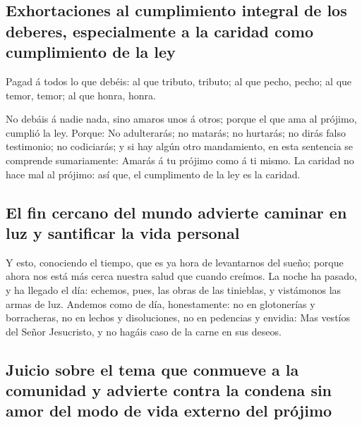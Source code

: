 \hypertarget{exhortaciones-al-cumplimiento-integral-de-los-deberes-especialmente-a-la-caridad-como-cumplimiento-de-la-ley}{%
\subsection{Exhortaciones al cumplimiento integral de los deberes,
especialmente a la caridad como cumplimiento de la
ley}\label{exhortaciones-al-cumplimiento-integral-de-los-deberes-especialmente-a-la-caridad-como-cumplimiento-de-la-ley}}

 Pagad á todos lo que debéis: al que tributo, tributo; al
que pecho, pecho; al que temor, temor; al que honra, honra.

 No debáis á nadie nada, sino amaros unos á otros; porque el
que ama al prójimo, cumplió la ley.  Porque: No adulterarás;
no matarás; no hurtarás; no dirás falso testimonio; no codiciarás; y si
hay algún otro mandamiento, en esta sentencia se comprende sumariamente:
Amarás á tu prójimo como á ti mismo.  La caridad no hace
mal al prójimo: así que, el cumplimento de la ley es la caridad.

\hypertarget{el-fin-cercano-del-mundo-advierte-caminar-en-luz-y-santificar-la-vida-personal}{%
\subsection{El fin cercano del mundo advierte caminar en luz y
santificar la vida
personal}\label{el-fin-cercano-del-mundo-advierte-caminar-en-luz-y-santificar-la-vida-personal}}

 Y esto, conociendo el tiempo, que es ya hora de
levantarnos del sueño; porque ahora nos está más cerca nuestra salud que
cuando creímos.  La noche ha pasado, y ha llegado el día:
echemos, pues, las obras de las tinieblas, y vistámonos las armas de
luz.  Andemos como de día, honestamente: no en glotonerías
y borracheras, no en lechos y disoluciones, no en pedencias y envidia:
 Mas vestíos del Señor Jesucristo, y no hagáis caso de la
carne en sus deseos.

\hypertarget{juicio-sobre-el-tema-que-conmueve-a-la-comunidad-y-advierte-contra-la-condena-sin-amor-del-modo-de-vida-externo-del-pruxf3jimo}{%
\subsection{Juicio sobre el tema que conmueve a la comunidad y advierte
contra la condena sin amor del modo de vida externo del
prójimo}\label{juicio-sobre-el-tema-que-conmueve-a-la-comunidad-y-advierte-contra-la-condena-sin-amor-del-modo-de-vida-externo-del-pruxf3jimo}}

